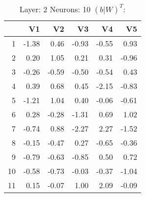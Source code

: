 \begin{table}[ht]
\centering
\begin{tabular}{rrrrrr}
  \hline
 & V1 & V2 & V3 & V4 & V5 \\ 
  \hline
1 & -1.38 & 0.46 & -0.93 & -0.55 & 0.93 \\ 
  2 & 0.20 & 1.05 & 0.21 & 0.31 & -0.96 \\ 
  3 & -0.26 & -0.59 & -0.50 & -0.54 & 0.43 \\ 
  4 & 0.39 & 0.68 & 0.45 & -2.15 & -0.83 \\ 
  5 & -1.21 & 1.04 & 0.40 & -0.06 & -0.61 \\ 
  6 & 0.28 & -0.28 & -1.31 & 0.69 & 1.02 \\ 
  7 & -0.74 & 0.88 & -2.27 & 2.27 & -1.52 \\ 
  8 & -0.15 & -0.47 & 0.27 & -0.65 & -0.36 \\ 
  9 & -0.79 & -0.63 & -0.85 & 0.50 & 0.72 \\ 
  10 & -0.58 & -0.73 & -0.03 & -0.37 & -1.04 \\ 
  11 & 0.15 & -0.07 & 1.00 & 2.09 & -0.09 \\ 
   \hline
\end{tabular}
\caption{Layer: 2 Neurons: 10  $(b|W)^T$: 
} 
\end{table}
